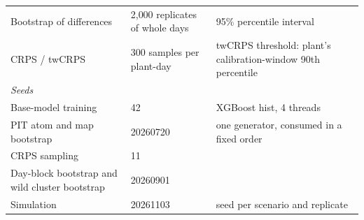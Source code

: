 \begin{longtable}{p{} p{} p{}}
Bootstrap of differences & 2{,}000 replicates of whole days & 95\% percentile interval \\
CRPS / twCRPS & 300 samples per plant-day & twCRPS threshold: plant's calibration-window 90th percentile \\
\textit{Seeds} &  &  \\
Base-model training & 42 & XGBoost hist, 4 threads \\
PIT atom and map bootstrap & 20260720 & one generator, consumed in a fixed order \\
CRPS sampling & 11 &  \\
Day-block bootstrap and wild cluster bootstrap & 20260901 &  \\
Simulation & 20261103 & seed per scenario and replicate \\
\end{longtable}
